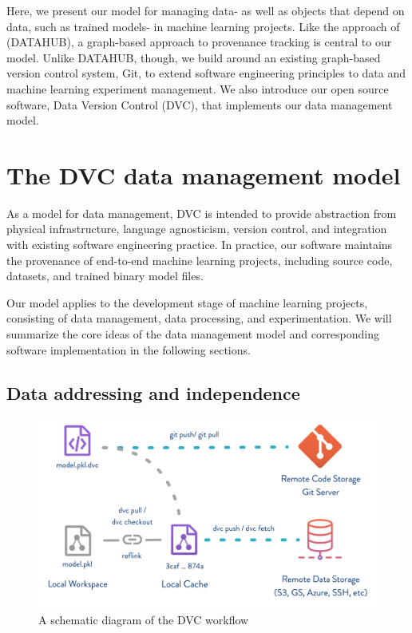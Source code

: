 \documentclass[10pt,sigconf, authordraft]{acmart}
\begin{document}
Here, we present our model for managing data- as well as objects that depend on data, such as trained models- in machine learning projects. Like the approach of \citet{Bhardwaj2015DataHub:Scale} (DATAHUB), a graph-based approach to provenance tracking is central to our model. Unlike DATAHUB, though, we build around an existing graph-based version control system, Git, to extend software engineering principles to data and machine learning experiment management. We also introduce our open source software, Data Version Control (DVC), that implements our data management model. 

\section{The DVC data management model}

As a model for data management, DVC is intended to provide abstraction from physical infrastructure, language agnosticism, version control, and integration with existing software engineering practice. In practice, our software maintains the provenance of end-to-end machine learning projects, including source code, datasets, and trained binary model files. 


Our model applies to the development stage of machine learning projects, consisting of data management, data processing, and experimentation. We will summarize the core ideas of the data management model and corresponding software implementation in the following sections. 

\subsection{Data addressing and independence}\label{dataindependence} 



\begin{figure}[h]
  \centering
  \includegraphics[width=\linewidth]{flow-large.png}
  \caption{A schematic diagram of the DVC workflow}
  \label{fig:fig1}
\end{figure}
\end{document}
